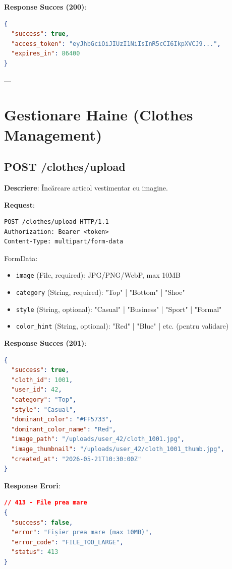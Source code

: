 \textbf{Response Succes (200)}:

\begin{lstlisting}[language=JSON]
{
  "success": true,
  "access_token": "eyJhbGciOiJIUzI1NiIsInR5cCI6IkpXVCJ9...",
  "expires_in": 86400
}
\end{lstlisting}

---

\section{Gestionare Haine (Clothes Management)}

\subsection{POST /clothes/upload}

\textbf{Descriere}: Încărcare articol vestimentar cu imagine.

\textbf{Request}:

\begin{lstlisting}[language=HTTP]
POST /clothes/upload HTTP/1.1
Authorization: Bearer <token>
Content-Type: multipart/form-data
\end{lstlisting}

FormData:
\begin{itemize}
    \item \texttt{image} (File, required): JPG/PNG/WebP, max 10MB
    \item \texttt{category} (String, required): "Top" | "Bottom" | "Shoe"
    \item \texttt{style} (String, optional): "Casual" | "Business" | "Sport" | "Formal"
    \item \texttt{color\_hint} (String, optional): "Red" | "Blue" | etc. (pentru validare)
\end{itemize}

\textbf{Response Succes (201)}:

\begin{lstlisting}[language=JSON]
{
  "success": true,
  "cloth_id": 1001,
  "user_id": 42,
  "category": "Top",
  "style": "Casual",
  "dominant_color": "#FF5733",
  "dominant_color_name": "Red",
  "image_path": "/uploads/user_42/cloth_1001.jpg",
  "image_thumbnail": "/uploads/user_42/cloth_1001_thumb.jpg",
  "created_at": "2026-05-21T10:30:00Z"
}
\end{lstlisting}

\textbf{Response Erori}:

\begin{lstlisting}[language=JSON]
// 413 - File prea mare
{
  "success": false,
  "error": "Fișier prea mare (max 10MB)",
  "error_code": "FILE_TOO_LARGE",
  "status": 413
}
\end{lstlisting}

